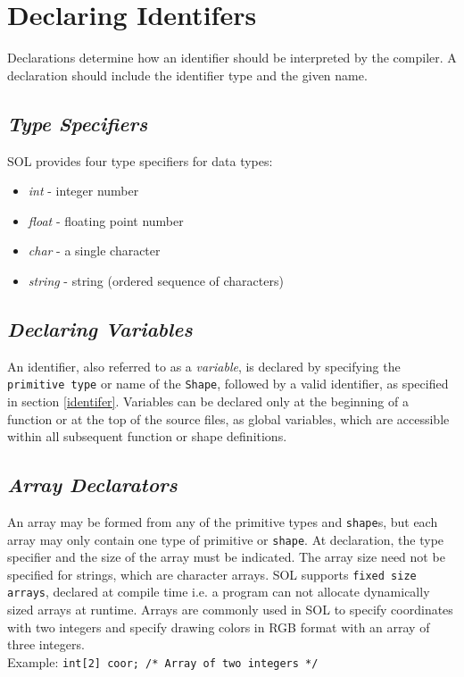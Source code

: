 \section{Declaring Identifers}

    Declarations determine how an identifier should be interpreted by the compiler. A declaration should include the identifier type and the given name.

    \subsection{\textit{Type Specifiers}} \label{type}
    SOL provides four type specifiers for data types:
    \begin{itemize}
        \itemsep0em
        \item \textit{int} - integer number
        \item \textit{float} - floating point number
        \item \textit{char} - a single character
        \item \textit{string} - string (ordered sequence of characters)
    \end{itemize}

    \subsection{\textit{Declaring Variables}}
    An identifier, also referred to as a \textit{variable}, is declared by specifying the \texttt{primitive type} or name of the \texttt{Shape}, followed by a valid identifier, as specified in section \ref{identifer}. Variables can be declared only at the beginning of a function or at the top of the source files, as global variables, which are accessible within all subsequent function or shape definitions.

    \subsection{\textit{Array Declarators}} \label{array}
    An array may be formed from any of the primitive types and \texttt{shape}s, but each array may only contain one type of primitive or \texttt{shape}. At declaration, the type specifier and the size of the array must be indicated. The array size need not be specified for strings, which are character arrays. SOL supports \texttt{fixed size arrays}, declared at compile time i.e. a program can not allocate dynamically sized arrays at runtime. Arrays are commonly used in SOL to specify coordinates with two integers and specify drawing colors in RGB format with an array of three integers.\\
    Example: \texttt{int[2] coor; /* Array of two integers */}

